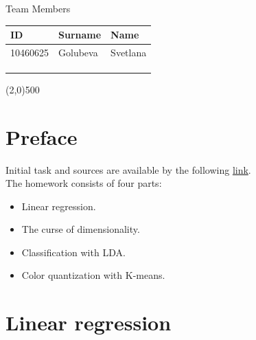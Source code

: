 \documentclass[a4paper,12pt,titlepage]{article} %
\begin{document}
\begin{titlepage}
\vspace{20pt}

\begin{center}
	{\large Team Members}
\end{center}
\begin{tabularx}{\textwidth}{|X|X|X|}
	\hline
	ID & Surname & Name\\
	\hline
	10460625 & Golubeva & Svetlana\\
	\hline
	 &  & \\
	\hline
	 &  & \\
	\hline
	 &  & \\
	\hline
\end{tabularx}

\vspace{\fill}
\begin{center}
	\line(2,0){500}
\end{center}

\end{titlepage}

\tableofcontents

\newpage
\listoftables

\listoffigures

\newpage
\section{Preface}
Initial task and sources are available by the following  \href{http://davide.eynard.it/2016/01/11/statistical-learning-with-r-2016-edition/}{link}. \\

The homework consists of four parts:
\begin{itemize}
	\item Linear regression.
	\item The curse of dimensionality.
	\item Classification with LDA.
	\item Color quantization with K-means.
\end{itemize}

\newpage
\section{Linear regression}
\end{document}
